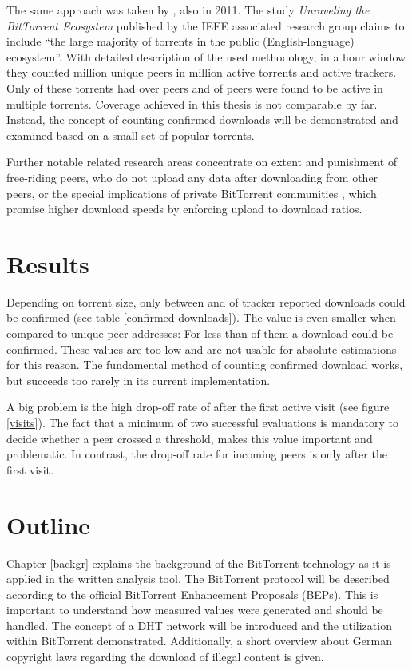 \documentclass[10pt, a4paper, twoside=false, headsepline]{scrbook}
\renewcommand{\_}{\origunderscore\allowbreak}
\begin{document}
The same approach was taken by \textcite{zhang2011unraveling}, also in 2011. The study \emph{Unraveling the BitTorrent Ecosystem} published by the IEEE associated research group claims to include ``the large majority of torrents in the public (English-language) ecosystem''. With detailed description of the used methodology, in a  hour window they counted  million unique peers in  million active torrents and  active trackers. Only  of these torrents had over  peers and  of peers were found to be active in multiple torrents. Coverage achieved in this thesis is not comparable by far. Instead, the concept of counting confirmed downloads will be demonstrated and examined based on a small set of popular torrents.

Further notable related research areas concentrate on extent \cite{locher2006free} and punishment \cite{levin2008bittorrent, bhakuni} of free-riding peers, who do not upload any data after downloading from other peers, or the special implications of private BitTorrent communities \cite{meulpolder2010public}, which promise higher download speeds by enforcing upload to download ratios.

\section{Results}
Depending on torrent size, only between  and  of tracker reported downloads could be confirmed (see table \ref{confirmed-downloads}). The value is even smaller when compared to unique peer addresses: For less than  of them a download could be confirmed. These values are too low and are not usable for absolute estimations for this reason. The fundamental method of counting confirmed download works, but succeeds too rarely in its current implementation.

A big problem is the high drop-off rate of  after the first active visit (see figure \ref{visits}). The fact that a minimum of two successful evaluations is mandatory to decide whether a peer crossed a threshold, makes this value important and problematic. In contrast, the drop-off rate for incoming peers is only  after the first visit.

\section{Outline}
Chapter \ref{backgr} explains the background of the BitTorrent technology as it is applied in the written analysis tool. The BitTorrent protocol will be described according to the official BitTorrent Enhancement Proposals (BEPs). This is important to understand how measured values were generated and should be handled. The concept of a DHT network will be introduced and the utilization within BitTorrent demonstrated. Additionally, a short overview about German copyright laws regarding the download of illegal content is given.
\end{document}
